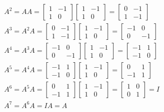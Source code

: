 	\begin{align*}
		&A^2=AA=\begin{bmatrix}
			1 & -1 \\
			1 & 0
		\end{bmatrix}\begin{bmatrix}
			1 & -1 \\
			1 & 0
		\end{bmatrix}=\begin{bmatrix}
			0 & -1 \\
			1 & -1
		\end{bmatrix} \\
		&A^3=A^2A=\begin{bmatrix}
			0 & -1 \\
			1 & -1
		\end{bmatrix}\begin{bmatrix}
			1 & -1 \\
			1 & 0
		\end{bmatrix}=\begin{bmatrix}
			-1 & 0 \\
			0 & -1
		\end{bmatrix} \\
		&A^4=A^3A=\begin{bmatrix}
			-1 & 0 \\
			0 & -1
		\end{bmatrix}\begin{bmatrix}
			1 & -1 \\
			1 & 0
		\end{bmatrix}=\begin{bmatrix}
			-1 & 1 \\
			-1 & 0
		\end{bmatrix} \\
		&A^5=A^4A=\begin{bmatrix}
			-1 & 1 \\
			-1 & 0
		\end{bmatrix}\begin{bmatrix}
			1 & -1 \\
			1 & 0
		\end{bmatrix}=\begin{bmatrix}
			0 & 1 \\
			-1 & 1
		\end{bmatrix} \\
		&A^6=A^5A=\begin{bmatrix}
			0 & 1 \\
			-1 & 1
		\end{bmatrix}\begin{bmatrix}
			1 & -1 \\
			1 & 0
		\end{bmatrix}=\begin{bmatrix}
			1 & 0 \\
			0 & 1
		\end{bmatrix} = I \\
		&A^7=A^6A=IA=A
	\end{align*}
